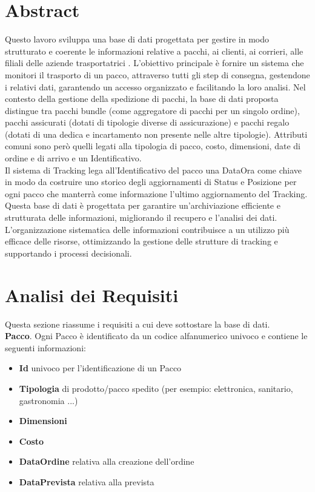 \section{Abstract}
Questo lavoro sviluppa una base di dati progettata per gestire in modo strutturato e
coerente le informazioni relative a pacchi, ai clienti, ai corrieri, alle filiali delle aziende trasportatrici . L’obiettivo principale è fornire un sistema che monitori il trasporto di un pacco, attraverso tutti gli step di consegna, gestendone i relativi dati, garantendo un accesso organizzato e facilitando la loro analisi.
Nel contesto della gestione della spedizione di pacchi, la base di dati proposta distingue tra pacchi bundle (come aggregatore di pacchi per un singolo ordine), pacchi assicurati (dotati di tipologie diverse di assicurazione) e pacchi regalo (dotati di una dedica e incartamento non presente nelle altre tipologie). Attributi comuni sono però quelli legati alla tipologia di pacco, costo, dimensioni, date di ordine e di arrivo e un Identificativo.\\ 
Il sistema di Tracking lega all'Identificativo del pacco una DataOra come chiave in modo da costruire uno storico degli aggiornamenti di Status e Posizione per ogni pacco che manterrà come informazione l'ultimo aggiornamento del Tracking. \\Questa base di dati è progettata per garantire un’archiviazione efficiente e strutturata delle informazioni, migliorando il recupero e l’analisi dei dati. L’organizzazione sistematica delle informazioni contribuisce a un utilizzo più efficace delle risorse, ottimizzando la gestione delle strutture di tracking e supportando i processi decisionali.

\newpage
\section{Analisi dei Requisiti}
Questa sezione riassume i requisiti a cui deve sottostare la base di dati.\\
\textbf{Pacco}. Ogni Pacco è identificato da un codice alfanumerico univoco e contiene le seguenti
informazioni:\\
\begin{itemize}
    \setlength{\itemindent}{+.5in}
    \item \textbf{Id} univoco per l'identificazione di un Pacco
    \item \textbf{Tipologia} di prodotto/pacco spedito \footnotesize{(per esempio: elettronica, sanitario, gastronomia ...)}
    \item \normalsize{\textbf{Dimensioni}}
    \item \textbf{Costo}
    \item \textbf{DataOrdine} relativa alla creazione dell'ordine
    \item \textbf{DataPrevista} relativa alla prevista 

\end{itemize}

